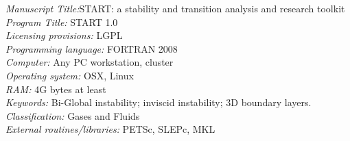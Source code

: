 \documentclass[preprint,12pt]{elsarticle}
\newcounter{bla}
\begin{document}
\begin{small}
\noindent
{\em Manuscript Title:}START: a stability and transition analysis and research toolkit                                       \\
{\em Program Title:} START 1.0                                          \\
{\em Licensing provisions:} LGPL                                  \\
{\em Programming language:} FORTRAN 2008                                  \\
{\em Computer:} Any PC workstation, cluster                                              \\
{\em Operating system:} OSX, Linux                                      \\
{\em RAM:} 4G bytes at least                                            \\
{\em Keywords:} Bi-Global instability; inviscid instability; 3D boundary layers.  \\
{\em Classification:} Gases and Fluids                                       \\
{\em External routines/libraries:}  PETSc, SLEPc, MKL                          \\

\end{small}
\end{document}
